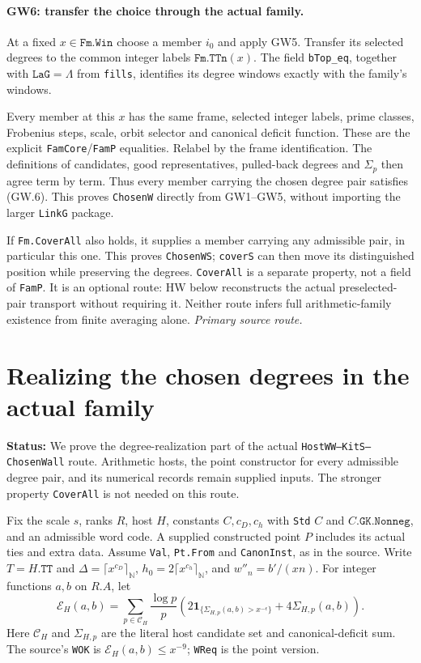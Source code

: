\documentclass[11pt,a4paper]{article}
\numberwithin{equation}{section}
\theoremstyle{remark}\newtheorem{remark}[theorem]{Remark}
\newcommand{\status}[1]{\textbf{Status:} #1}
\begin{document}
\paragraph{GW6: transfer the choice through the actual family.}
At a fixed $x\in\texttt{Fm.Win}$ choose a member $i_0$ and apply GW5.
Transfer its selected degrees to the common integer labels
$\texttt{Fm.TTn}(x)$. The field \texttt{bTop\_eq}, together with
$\texttt{LaG}=\Lambda$ from \texttt{fills}, identifies its degree
windows exactly with the family's windows.

Every member at this $x$ has the same frame, selected integer labels,
prime classes, Frobenius steps, scale, orbit selector and canonical
deficit function. These are the explicit \texttt{FamCore}/\texttt{FamP}
equalities. Relabel by the frame identification. The definitions of
candidates, good representatives, pulled-back degrees and $\Sigma_p$
then agree term by term. Thus every member carrying the chosen degree
pair satisfies (GW.6). This proves \texttt{ChosenW} directly from
GW1--GW5, without importing the larger \texttt{LinkG} package.

If \texttt{Fm.CoverAll} also holds, it supplies a member carrying
any admissible pair, in particular this one. This proves
\texttt{ChosenWS}; \texttt{coverS} can then move its distinguished
position while preserving the degrees. \texttt{CoverAll} is a
separate property, not a field of \texttt{FamP}. It is an optional
route: HW below reconstructs the actual preselected-pair transport
without requiring it. Neither route infers full arithmetic-family
existence from finite averaging alone.
\noindent\textit{Primary source route.}\cite{global-degree-choice}


\section{Realizing the chosen degrees in the actual family}
\label{sec:host-weight-join}

\status{We prove the degree-realization part of the actual
\texttt{HostWW--KitS--ChosenWall} route. Arithmetic hosts, the point
constructor for every admissible degree pair, and its numerical records
remain supplied inputs. The stronger property \texttt{CoverAll} is not
needed on this route.}

Fix the scale $s$, ranks $R$, host $H$, constants $C,c_D,c_h$ with
\texttt{Std} $C$ and $C.\texttt{GK.Nonneg}$, and an
admissible word code. A supplied constructed point $P$ includes its actual
ties and extra data. Assume \texttt{Val}, \texttt{Pt.From} and
\texttt{CanonInst}, as in the source. Write $T=H.\texttt{TT}$ and
$\Delta=\lceil x^{c_D}\rceil_{\mathbb N}$,
$h_0=2\lceil x^{c_h}\rceil_{\mathbb N}$, and $w''_n=b'/(xn)$.
For integer functions $a,b$ on $R.A$, let
\[
 \mathcal E_H(a,b)=
 \sum_{p\in\mathcal C_H}\frac{\log p}{p}
 \left(2\mathbf1_{\{\Sigma_{H,p}(a,b)>x^{-\epsilon}\}}
       +4\Sigma_{H,p}(a,b)\right).                 \tag{HW.1}
\]
Here $\mathcal C_H$ and $\Sigma_{H,p}$ are the literal host candidate
set and canonical-deficit sum. The source's \texttt{WOK} is
$\mathcal E_H(a,b)\le x^{-9}$; \texttt{WReq} is the point version.
\end{document}
